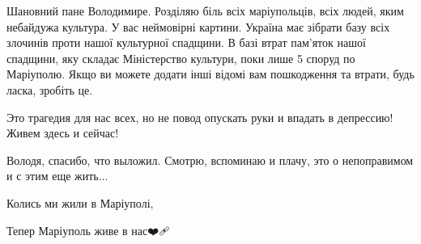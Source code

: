 Шановний пане Володимире. Розділяю біль всіх маріупольців, всіх людей, яким
небайдужа культура. У вас неймовірні картини. Україна має зібрати базу всіх
злочинів проти нашої культурної спадщини. В базі втрат пам'яток нашої спадщини,
яку складає Міністерство культури, поки лише 5 споруд по Маріуполю. Якщо ви
можете додати інші відомі вам пошкодження та втрати, будь ласка, зробіть це.


Это трагедия для нас всех, но не повод опускать руки и впадать в депрессию! Живем здесь и сейчас!


Володя, спасибо, что выложил. Смотрю, вспоминаю и плачу, это о непоправимом и с этим еще жить...


Колись ми жили в Маріуполі,

Тепер Маріуполь живе в нас❤️🩹
